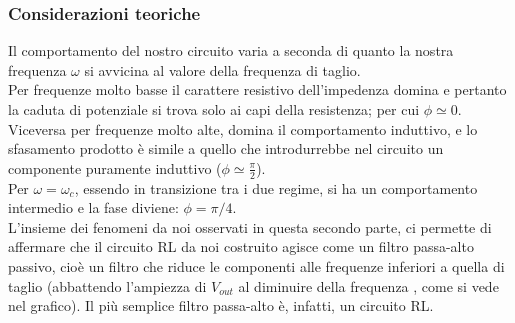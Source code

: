 \subsubsection{Considerazioni teoriche}
Il comportamento del nostro circuito varia a seconda di quanto la nostra frequenza $\omega$ si avvicina al valore della frequenza di taglio. \\
Per frequenze molto basse il carattere resistivo dell'impedenza domina e pertanto la caduta di potenziale si trova solo ai capi della resistenza; per cui $ \phi \simeq 0$. Viceversa per frequenze molto alte, domina il comportamento induttivo, e lo sfasamento prodotto è simile a quello che introdurrebbe nel circuito un componente puramente induttivo ($\phi \simeq \frac{\pi}{2}$).  \\
Per $\omega = \omega_c$, essendo in transizione tra i due regime, si ha un comportamento intermedio e la fase diviene: $ \phi = \pi/4$. \\

L'insieme dei fenomeni da noi osservati in questa secondo parte, ci permette di affermare che il circuito RL da noi costruito agisce come un filtro passa-alto passivo, cioè un filtro che riduce le componenti alle frequenze inferiori a quella di taglio (abbattendo l'ampiezza di $V_{out}$ al diminuire della frequenza , come si vede nel grafico). Il più semplice filtro passa-alto è, infatti, un circuito RL. 
